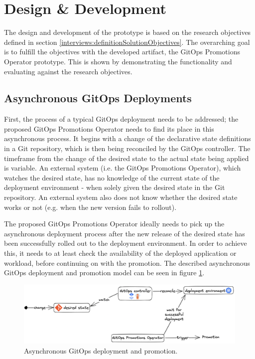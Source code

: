 \section{Design \& Development}

The design and development of the prototype
is based on the research objectives defined in section
\ref{interviews:definitionSolutionObjectives}.
The overarching goal is to fulfill the objectives with the developed artifact,
the GitOps Promotions Operator prototype.
This is shown by demonstrating the functionality and evaluating against the research objectives.

\subsection{Asynchronous GitOps Deployments}

First, the process of a typical GitOps deployment needs to be addressed;
the proposed GitOps Promotions Operator needs to find its place in this asynchronous process.
It begins with a change of the declarative state definitions in a Git repository,
which is then being reconciled by the GitOps controller.
The timeframe from the change of the desired state to the actual state being applied
is variable. An external system (i.e. the GitOps Promotions Operator), which watches the desired state, has no knowledge of
the current state of the deployment environment - when solely given the desired state in the
Git repository. An external system also does not know whether the desired state works or not
(e.g. when the new version fails to rollout).

The proposed GitOps Promotions Operator ideally needs to pick up
the asynchronous deployment process after the new release of the desired state
has been successfully rolled out to the deployment environment.
In order to achieve this,
it needs to at least check the availability of the deployed application or workload,
before continuing on with the promotion.
The described asynchronous GitOps deployment and promotion model can be seen in figure
\ref{fig:async-gitops-promo-arch}.

\begin{figure}[h]
	\centering
	\includegraphics[width=1.00\linewidth]{assets/async-gitops-promo-arch.png}
	\caption{Asynchronous GitOps deployment and promotion.
	}
	\label{fig:async-gitops-promo-arch}	
\end{figure}

